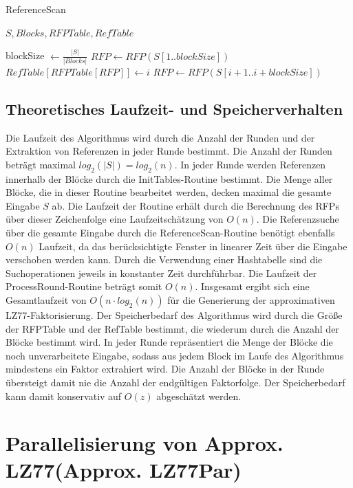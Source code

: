 \begin{algorithm}[ht]
\centering
\caption{ReferenceScan} \label{alg:refscan}
\algorithmicrequire $S, Blocks, RFPTable, RefTable$
\begin{algorithmic}
    \STATE blockSize $\gets \frac{|S|}{|Blocks|}$
    \STATE $RFP \gets RFP(S[1..blockSize])$
            \STATE $RefTable[RFPTable[RFP]] \gets i$
        \ENDIF
        \STATE $RFP \gets RFP(S[i+1..i+blockSize])$ 
    \ENDFOR
\end{algorithmic}
\end{algorithm}


\subsection{Theoretisches Laufzeit- und Speicherverhalten}
Die Laufzeit des Algorithmus wird durch die Anzahl der Runden und der Extraktion von Referenzen in jeder Runde bestimmt. Die Anzahl der Runden beträgt maximal $log_2(|S|)=log_2(n)$. In jeder Runde
werden Referenzen innerhalb der Blöcke durch die InitTables-Routine bestimmt. Die Menge aller Blöcke, die in dieser Routine bearbeitet werden, decken maximal die gesamte Eingabe $S$ ab. Die Laufzeit
der Routine erhält durch die Berechnung des RFPs über dieser Zeichenfolge eine Laufzeitschätzung von $O(n)$. Die Referenzsuche über die gesamte Eingabe durch die ReferenceScan-Routine benötigt ebenfalls
$O(n)$ Laufzeit, da das berücksichtigte Fenster in linearer Zeit über die Eingabe verschoben werden kann. Durch die Verwendung einer Hashtabelle sind die Suchoperationen jeweils in konstanter Zeit
durchführbar. Die Laufzeit der ProcessRound-Routine beträgt somit $O(n)$. Insgesamt ergibt sich eine Gesamtlaufzeit von $O(n \cdot log_2(n))$ für die Generierung der approximativen LZ77-Faktorisierung. 
Der Speicherbedarf des Algorithmus wird durch die Größe der RFPTable und der RefTable bestimmt, die wiederum durch die Anzahl der Blöcke bestimmt wird. In jeder Runde repräsentiert die Menge der Blöcke 
die noch unverarbeitete Eingabe, sodass aus jedem Block im Laufe des Algorithmus mindestens ein Faktor extrahiert wird. Die Anzahl der Blöcke in der Runde übersteigt damit nie die Anzahl der endgültigen
Faktorfolge. Der Speicherbedarf kann damit konservativ auf $O(z)$ abgeschätzt werden.

\section{Parallelisierung von Approx. LZ77(Approx. LZ77Par)}
